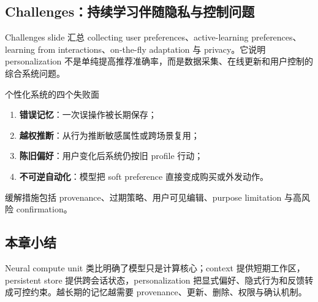 \subsection{Challenges：持续学习伴随隐私与控制问题}

Challenges slide 汇总 collecting user preferences、active-learning preferences、learning from interactions、on-the-fly adaptation 与 privacy。它说明 personalization 不是单纯提高推荐准确率，而是数据采集、在线更新和用户控制的综合系统问题。


\begin{warningbox}{个性化系统的四个失败面}
\begin{enumerate}
  \item \textbf{错误记忆}：一次误操作被长期保存；
  \item \textbf{越权推断}：从行为推断敏感属性或跨场景复用；
  \item \textbf{陈旧偏好}：用户变化后系统仍按旧 profile 行动；
  \item \textbf{不可逆自动化}：模型把 soft preference 直接变成购买或外发动作。
\end{enumerate}
缓解措施包括 provenance、过期策略、用户可见编辑、purpose limitation 与高风险 confirmation。
\end{warningbox}


\subsection{本章小结}

Neural compute unit 类比明确了模型只是计算核心；context 提供短期工作区，persistent store 提供跨会话状态，personalization 把显式偏好、隐式行为和反馈转成可控约束。越长期的记忆越需要 provenance、更新、删除、权限与确认机制。


